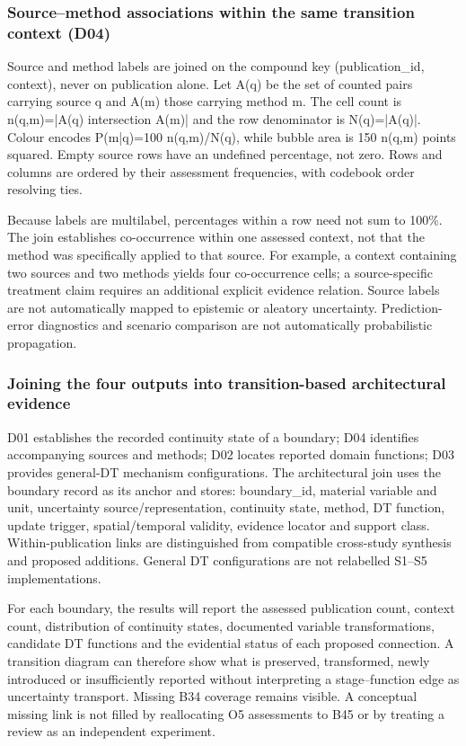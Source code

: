 \subsubsection{Source–method associations within the same transition context (D04)}
Source and method labels are joined on the compound key (publication\_id, context), never on publication alone. Let A(q) be the set of counted pairs carrying source q and A(m) those carrying method m. The cell count is n(q,m)=|A(q) intersection A(m)| and the row denominator is N(q)=|A(q)|. Colour encodes P(m|q)=100 n(q,m)/N(q), while bubble area is 150 n(q,m) points squared. Empty source rows have an undefined percentage, not zero. Rows and columns are ordered by their assessment frequencies, with codebook order resolving ties.

Because labels are multilabel, percentages within a row need not sum to 100\%. The join establishes co-occurrence within one assessed context, not that the method was specifically applied to that source. For example, a context containing two sources and two methods yields four co-occurrence cells; a source-specific treatment claim requires an additional explicit evidence relation. Source labels are not automatically mapped to epistemic or aleatory uncertainty. Prediction-error diagnostics and scenario comparison are not automatically probabilistic propagation.


\subsubsection{Joining the four outputs into transition-based architectural evidence}
D01 establishes the recorded continuity state of a boundary; D04 identifies accompanying sources and methods; D02 locates reported domain functions; D03 provides general-DT mechanism configurations. The architectural join uses the boundary record as its anchor and stores: boundary\_id, material variable and unit, uncertainty source/representation, continuity state, method, DT function, update trigger, spatial/temporal validity, evidence locator and support class. Within-publication links are distinguished from compatible cross-study synthesis and proposed additions. General DT configurations are not relabelled S1–S5 implementations.

For each boundary, the results will report the assessed publication count, context count, distribution of continuity states, documented variable transformations, candidate DT functions and the evidential status of each proposed connection. A transition diagram can therefore show what is preserved, transformed, newly introduced or insufficiently reported without interpreting a stage–function edge as uncertainty transport. Missing B34 coverage remains visible. A conceptual missing link is not filled by reallocating O5 assessments to B45 or by treating a review as an independent experiment.


